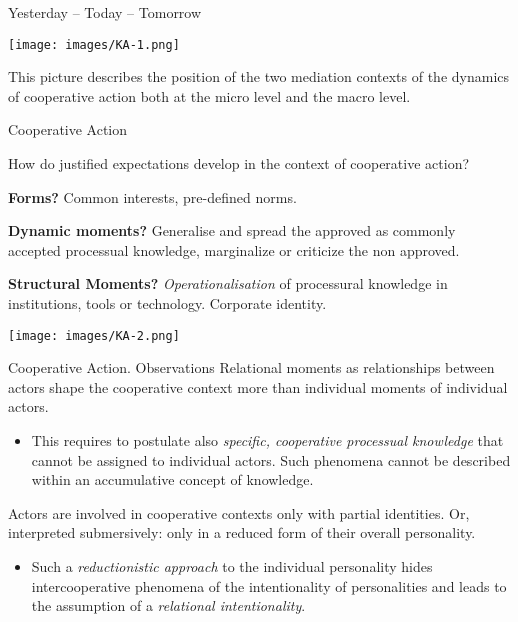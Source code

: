 \documentclass{beamer}
\begin{document}
\begin{frame}{Yesterday -- Today -- Tomorrow}

  \begin{center}
    \texttt{[image: images/KA-1.png]}
  \end{center}
  
This picture describes the position of the two mediation contexts of the
dynamics of cooperative action both at the micro level and the macro level.
\end{frame}

\begin{frame}{Cooperative Action}

  \begin{minipage}{.5\textwidth}\small
  How do justified expectations develop in the context of cooperative action?
  \vskip8pt
  
\textbf{Forms?} Common interests, pre-defined norms.\vskip8pt

\textbf{Dynamic moments?} Generalise and spread the approved as commonly
accepted processual knowledge, marginalize or criticize the non
approved.  \vskip8pt

\textbf{Structural Moments?}  \emph{Operationa\-lisation} of processural
knowledge in institutions, tools or technology.  Corporate identity.  \vskip8pt
  \end{minipage}
\hfill
  \begin{minipage}{.47\textwidth}
  \begin{center}
    \texttt{[image: images/KA-2.png]}
  \end{center}
  
  \end{minipage}
\end{frame}

\begin{frame}{Cooperative Action. Observations}
Relational moments as relationships between actors shape the cooperative
context more than individual moments of individual actors.\vspace{-1em}
\begin{itemize}
\item This requires to postulate also \emph{specific, cooperative processual
  knowledge} that cannot be assigned to individual actors. Such phenomena
  cannot be described within an accumulative concept of knowledge.
\end{itemize}
Actors are involved in cooperative contexts only with partial identities. Or,
interpreted submersively: only in a reduced form of their overall personality.
\vspace{-1em}
\begin{itemize}
\item Such a \emph{reductionistic approach} to the individual personality
  hides intercooperative phenomena of the intentionality of personalities and
  leads to the assumption of a \emph{relational intentionality}.
\end{itemize}
\end{frame}
\end{document}
